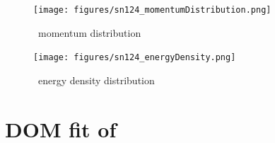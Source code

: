 \begin{figure}[H]
    \centering
    \texttt{[image: figures/sn124\_momentumDistribution.png]}
    \caption{\snFour\ momentum distribution}
    \label{DOMFitData_sn124_momentumDistribution}
\end{figure}

\begin{figure}[H]
    \centering
    \texttt{[image: figures/sn124\_energyDensity.png]}
    \caption{\snFour\ energy density distribution}
    \label{DOMFitData_sn124_energyDensity}
\end{figure}

\section{DOM fit of \pbEight}

